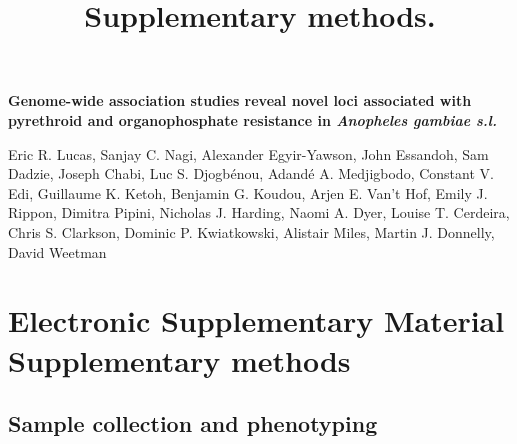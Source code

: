 \documentclass[a4paper,12pt]{article}
\title{Supplementary methods.}
\begin{document}
\onehalfspacing

\begin{center}
	\Large
	\noindent \textbf{Genome-wide association studies reveal novel loci associated with pyrethroid and organophosphate resistance in \textit{Anopheles gambiae s.l.}}

	\normalsize

	\vskip 3cm

\end{center}

\noindent Eric R. Lucas, Sanjay C. Nagi, Alexander Egyir-Yawson, John Essandoh, Sam Dadzie, Joseph Chabi, Luc S. Djogbénou, Adandé A. Medjigbodo, Constant V. Edi, Guillaume K. Ketoh, Benjamin G. Koudou, Arjen E. Van’t Hof, Emily J. Rippon, Dimitra Pipini, Nicholas J. Harding, Naomi A. Dyer, Louise T. Cerdeira, Chris S. Clarkson, Dominic P. Kwiatkowski, Alistair Miles, Martin J. Donnelly, David Weetman 
 
\vskip 2cm 


\section*{Electronic Supplementary Material \\ Supplementary methods}

\clearpage

\subsection{Sample collection and phenotyping}
\end{document}
